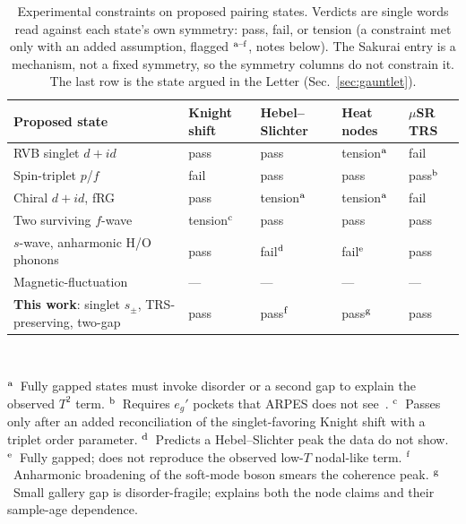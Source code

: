 \documentclass[aps,10pt,preprint,superscriptaddress,floatfix]{revtex4-2}
\begin{document}
\begin{table}[t]
  \caption{Experimental constraints on proposed pairing states. Verdicts are single words read
  against each state's own symmetry:
  pass, fail, or tension (a constraint met only with an added assumption, flagged
  $^{\rm a\text{--}f}$, notes below). The Sakurai entry is a mechanism, not a fixed symmetry, so the
  symmetry columns do not constrain it. The last row is the state argued in the Letter
  (Sec.~\ref{sec:gauntlet}).}
  \label{tab:gauntlet}
  \renewcommand{\arraystretch}{1.3}%
  \begin{tabular}{@{}p{4.4cm}p{2.0cm}p{2.0cm}p{2.0cm}p{2.0cm}@{}}
    \toprule
    \textbf{Proposed state} & \textbf{Knight shift} & \textbf{Hebel--Slichter} &
    \textbf{Heat nodes} & \textbf{$\mu$SR TRS}\\
    \midrule
    RVB singlet $d+id$~\cite{Baskaran2003,KumarShastry2003,WangLeeLee2004}
      & pass & pass & tension$^{\rm a}$ & fail\\
    Spin-triplet $p$/$f$~\cite{TanakaHu2003,KurokiTanakaArita2004}
      & fail & pass & pass & pass$^{\rm b}$\\
    Chiral $d+id$, fRG~\cite{Kiesel2013}
      & pass & tension$^{\rm a}$ & tension$^{\rm a}$ & fail\\
    Two surviving $f$-wave~\cite{MazinJohannes2005}
      & tension$^{\rm c}$ & pass & pass & pass\\
    $s$-wave, anharmonic H/O phonons~\cite{Lynn2003}
      & pass & fail$^{\rm d}$ & fail$^{\rm e}$ & pass\\
    Magnetic-fluctuation~\cite{Sakurai2015} & --- & --- & --- & ---\\
    \midrule
    \textbf{This work}: singlet $s_\pm$, TRS-preserving, two-gap
      & pass & pass$^{\rm f}$ & pass$^{\rm g}$ & pass\\
    \bottomrule
  \end{tabular}\\[4pt]
  \parbox{0.98\textwidth}{\footnotesize
  $^{\rm a}$~Fully gapped states must invoke disorder or a second gap to explain the observed
  $T^2$ term.
  $^{\rm b}$~Requires $e_g'$ pockets that ARPES does not see~\cite{Geck2007}.
  $^{\rm c}$~Passes only after an added reconciliation of the singlet-favoring Knight shift with a
  triplet order parameter.
  $^{\rm d}$~Predicts a Hebel--Slichter peak the data do not show.
  $^{\rm e}$~Fully gapped; does not reproduce the observed low-$T$ nodal-like term.
  $^{\rm f}$~Anharmonic broadening of the soft-mode boson smears the coherence peak.
  $^{\rm g}$~Small gallery gap is disorder-fragile; explains both the node claims and their
  sample-age dependence.}
\end{table}
\end{document}
